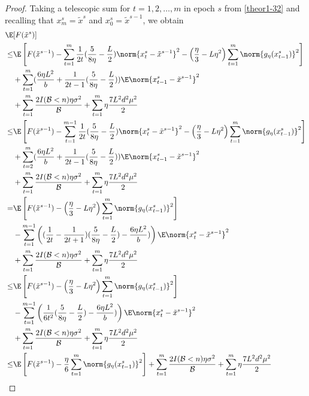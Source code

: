 \begin{proof}
Taking a telescopic sum for $t = 1, 2, \ldots, m$ in epoch $s$ from \eqref{theor1-32} and recalling that $x_m^s = \tilde{x}^s$ and $x_0^s = \tilde{x}^{s-1}$, we obtain
 \begin{align} 
\E&[F(\tilde{x}^s)] \notag
\\ \leq& \E\left[F(\tilde{x}^{s-1})  -\sum_{t=1}^m\frac{1}{2t}(\frac{5}{8\eta} - \frac{L}{2})\norm{{x}_t^s-\tilde{x}^{s-1}}^2- \left(\frac{\eta}{3}-L\eta^2\right)\sum_{t=1}^m\norm{g_{\eta}(x_{t-1}^s)}^2\right]\notag\\
&+\sum_{t=1}^m(\frac{6\eta L^2}{b}+\frac{1}{2t-1}(\frac{5}{8\eta} - \frac{L}{2}))\E\norm{x_{t-1}^s-\tilde{x}^{s-1}}^2\notag\\
&+ \sum_{t=1}^m \frac{2I(\mathcal{B} < n)\eta \sigma ^2}{\mathcal{B}}+\sum_{t=1}^m \eta \frac{7L^2 d^2 \mu^2}{2}\notag\\
\leq& \E\left[F(\tilde{x}^{s-1})  -\sum_{t=1}^{m-1}\frac{1}{2t}(\frac{5}{8\eta} - \frac{L}{2})\norm{{x}_t^s-\tilde{x}^{s-1}}^2- \left(\frac{\eta}{3}-L\eta^2\right)\sum_{t=1}^m\norm{g_{\eta}(x_{t-1}^s)}^2\right]\notag\\
&+\sum_{t=2}^m(\frac{6\eta L^2}{b}+\frac{1}{2t-1}(\frac{5}{8\eta} - \frac{L}{2}))\E\norm{x_{t-1}^s-\tilde{x}^{s-1}}^2\notag\\
&+ \sum_{t=1}^m \frac{2I(\mathcal{B} < n)\eta \sigma ^2}{\mathcal{B}}+\sum_{t=1}^m \eta \frac{7L^2 d^2 \mu^2}{2}\label{theor1-34}
\\
=& \E\left[F(\tilde{x}^{s-1}) - \left(\frac{\eta}{3}-L\eta^2\right)\sum_{t=1}^m\norm{g_{\eta}(x_{t-1}^s)}^2\right]\notag\\
&-\sum_{t=1}^{m-1}\left((\frac{1}{2t} - \frac{1}{2t+1})(\frac{5}{8\eta} - \frac{L}{2})-\frac{6\eta L^2 }{b})\right)\E\norm{x_{t}^s-\tilde{x}^{s-1}}^2\notag\\
&+ \sum_{t=1}^m \frac{2I(\mathcal{B} < n)\eta \sigma ^2}{\mathcal{B}}+\sum_{t=1}^m \eta \frac{7 L^2 d^2 \mu^2}{2}\notag\\
\leq& \E\left[F(\tilde{x}^{s-1}) - \left(\frac{\eta}{3}-L\eta^2\right)\sum_{t=1}^m\norm{g_{\eta}(x_{t-1}^s)}^2\right]\notag\\
&-\sum_{t=1}^{m-1}\left(\frac{1}{6t^2}(\frac{5}{8\eta} - \frac{L}{2})-\frac{6\eta L^2 }{b})\right)\E\norm{x_{t}^s-\tilde{x}^{s-1}}^2\notag\\
&+ \sum_{t=1}^m \frac{2I(\mathcal{B} < n)\eta \sigma ^2}{\mathcal{B}}+\sum_{t=1}^m \eta \frac{7 L^2 d^2 \mu^2}{2}\notag\\
\leq& \E\left[F(\tilde{x}^{s-1}) - \frac{\eta}{6}\sum_{t=1}^m\norm{g_{\eta}(x_{t-1}^s)}^2\right]+ \sum_{t=1}^m \frac{2I(\mathcal{B} < n)\eta \sigma ^2}{\mathcal{B}}+\sum_{t=1}^m \eta \frac{7 L^2 d^2 \mu^2}{2}\label{theor1-35}

\end{align}
\end{proof}
